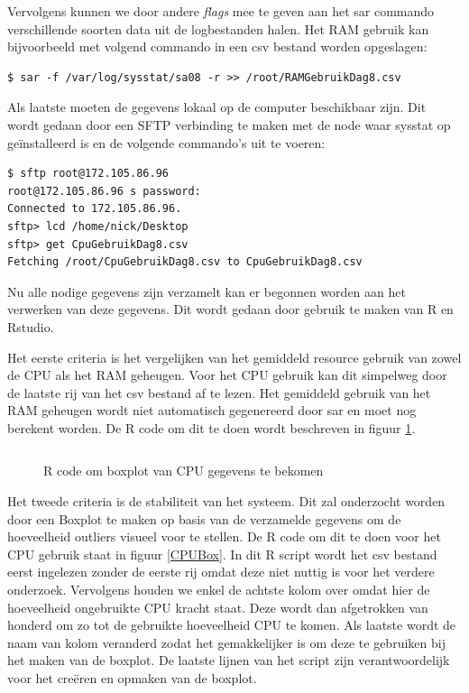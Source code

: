 Vervolgens kunnen we door andere \textit{flags} mee te geven aan het sar commando verschillende soorten data uit de logbestanden halen. Het RAM gebruik kan bijvoorbeeld met volgend commando in een csv bestand worden opgeslagen:

\begin{verbatim} 
$ sar -f /var/log/sysstat/sa08 -r >> /root/RAMGebruikDag8.csv
\end{verbatim}

Als laatste moeten de gegevens lokaal op de computer beschikbaar zijn. Dit wordt gedaan door een SFTP verbinding te maken met de node waar sysstat op geïnstalleerd is en de volgende commando's uit te voeren:

\begin{verbatim} 
$ sftp root@172.105.86.96
root@172.105.86.96 s password:
Connected to 172.105.86.96.
sftp> lcd /home/nick/Desktop
sftp> get CpuGebruikDag8.csv
Fetching /root/CpuGebruikDag8.csv to CpuGebruikDag8.csv
\end{verbatim}

Nu alle nodige gegevens zijn verzamelt kan er begonnen worden aan het verwerken van deze gegevens. Dit wordt gedaan door gebruik te maken van R en Rstudio. 

Het eerste criteria is het vergelijken van het gemiddeld resource gebruik van zowel de CPU als het RAM geheugen. Voor het CPU gebruik kan dit simpelweg door de laatste rij van het csv bestand af te lezen. Het gemiddeld gebruik van het RAM geheugen wordt niet automatisch gegenereerd door sar en moet nog berekent worden. De R code om dit te doen wordt beschreven in figuur \ref{RAMAVG}.

\begin{figure}[h] 
	\inputminted[fontsize=\footnotesize,linenos]{R}{files/dataRAMAVG.R}
	\caption{R code om boxplot van CPU gegevens te bekomen}
	\label{RAMAVG}
\end{figure}
%

Het tweede criteria is de stabiliteit van het systeem. Dit zal onderzocht worden door een Boxplot te maken op basis van de verzamelde gegevens om de hoeveelheid outliers visueel voor te stellen. De R code om dit te doen voor het CPU gebruik staat in figuur \ref{CPUBox}. In dit R script wordt het csv bestand eerst ingelezen zonder de eerste rij omdat deze niet nuttig is voor het verdere onderzoek. Vervolgens houden we enkel de achtste kolom over omdat hier de hoeveelheid ongebruikte CPU kracht staat. Deze wordt dan afgetrokken van honderd om zo tot de gebruikte hoeveelheid CPU te komen. Als laatste wordt de naam van kolom veranderd zodat het gemakkelijker is om deze te gebruiken bij het maken van de boxplot. De laatste lijnen van het script zijn verantwoordelijk voor het creëren en opmaken van de boxplot.

